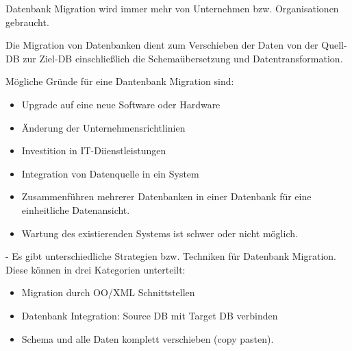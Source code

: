 Datenbank Migration wird immer mehr von Unternehmen bzw. Organisationen gebraucht. 

Die Migration von Datenbanken dient zum Verschieben der Daten von der Quell-DB zur Ziel-DB einschließlich die Schemaübersetzung und Datentransformation.


Mögliche Gründe für eine Dantenbank Migration sind:
\begin{itemize}
	\item Upgrade auf eine neue Software oder Hardware
	\item Änderung der Unternehmensrichtlinien
	\item Investition in IT-Diienstleistungen
	\item Integration von Datenquelle in ein System
	\item Zusammenführen mehrerer Datenbanken in einer Datenbank für eine einheitliche Datenansicht.
	\item Wartung des existierenden Systems ist schwer oder nicht möglich.
\end{itemize}

- Es gibt unterschiedliche Strategien bzw. Techniken für Datenbank Migration. Diese können in drei Kategorien unterteilt:

\begin{itemize}
	\item Migration durch OO/XML Schnittstellen
	\item Datenbank Integration: Source DB mit Target DB verbinden
	\item Schema und alle Daten komplett verschieben (copy pasten).
\end{itemize}


